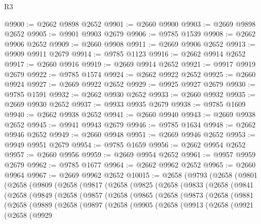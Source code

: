 \begin{lexlean}{R3}
\begin{coremodule}
@9900 := @2662 @9898 @2652
@9901 := @2660 @9900
@9903 := @2669 @9898 @2652
@9905 := @9901 @9903 @2679
@9906 := @9785 @1539
@9908 := @2662 @9906 @2652
@9909 := @2660 @9908
@9911 := @2669 @9906 @2652
@9913 := @9909 @9911 @2679
@9914 := @9785 @1123
@9916 := @2662 @9914 @2652
@9917 := @2660 @9916
@9919 := @2669 @9914 @2652
@9921 := @9917 @9919 @2679
@9922 := @9785 @1574
@9924 := @2662 @9922 @2652
@9925 := @2660 @9924
@9927 := @2669 @9922 @2652
@9929 := @9925 @9927 @2679
@9930 := @9785 @1591
@9932 := @2662 @9930 @2652
@9933 := @2660 @9932
@9935 := @2669 @9930 @2652
@9937 := @9933 @9935 @2679
@9938 := @9785 @1609
@9940 := @2662 @9938 @2652
@9941 := @2660 @9940
@9943 := @2669 @9938 @2652
@9945 := @9941 @9943 @2679
@9946 := @9785 @1634
@9948 := @2662 @9946 @2652
@9949 := @2660 @9948
@9951 := @2669 @9946 @2652
@9953 := @9949 @9951 @2679
@9954 := @9785 @1659
@9956 := @2662 @9954 @2652
@9957 := @2660 @9956
@9959 := @2669 @9954 @2652
@9961 := @9957 @9959 @2679
@9962 := @9785 @1677
@9964 := @2662 @9962 @2652
@9965 := @2660 @9964
@9967 := @2669 @9962 @2652
@10015 := @2658
    (@9793
      (@2658
        (@9801
          (@2658
            (@9809
              (@2658
                (@9817
                  (@2658
                    (@9825
                      (@2658
                        (@9833
                          (@2658
                            (@9841
                              (@2658
                                (@9849
                                  (@2658
                                    (@9857
                                      (@2658
                                        (@9865
                                          (@2658
                                            (@9873
                                              (@2658
                                                (@9881
                                                  (@2658
                                                    (@9889
                                                      (@2658
                                                        (@9897
                                                          (@2658
                                                            (@9905
                                                              (@2658
                                                                (@9913
                                                                  (@2658
                                                                    (@9921
                                                                      (@2658
                                                                        (@9929

\end{coremodule}
\end{lexlean}
